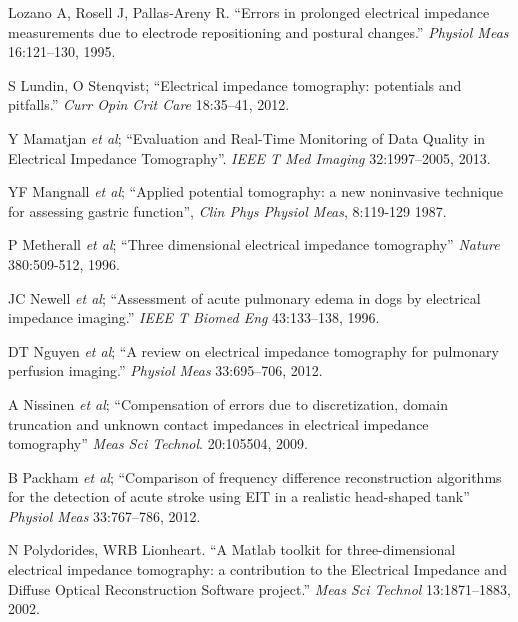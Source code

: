 \documentclass[12pt]{article} \usepackage[margin=3cm]{geometry} \usepackage[margin=20pt,font=small,labelfont=bf]{caption}\def\TBLWIDA{35mm}\def\TBLWIDB{95mm}
\newcommand{\ifmaxthree}[2]{#2 {\em et al}; }
\begin{document}
\begin{thebibliography}{00}
Lozano A, Rosell J, Pallas-Areny R. 
``Errors in prolonged electrical impedance measurements due to electrode repositioning and postural changes.''
{\em  Physiol Meas} 16:121--130, 1995.

S Lundin, O Stenqvist;
``Electrical impedance tomography: potentials and pitfalls.''
{\em Curr Opin Crit Care} 18:35--41, 2012.


\ifmaxthree{
Y Mamatjan, B Grychtol, P Gaggero, J Justiz, V Koch, A Adler. 
}{
Y Mamatjan
}
``Evaluation and Real-Time Monitoring of Data Quality in Electrical Impedance Tomography''.
{\em IEEE T Med Imaging} 32:1997--2005, 2013.

\ifmaxthree{
YF Mangnall, AJ Baxter, R Avill, NC Bird, BH Brown, DC Barber, AD Seagar, AG Johnson, NW Read
}{
YF Mangnall
}
``Applied potential tomography: a new noninvasive technique for assessing gastric function'',
{\em Clin Phys Physiol Meas}, 8:119-129 1987.

\ifmaxthree{
P Metherall, DC Barber, RH Smallwood, BH Brown.
}{
P Metherall
}
``Three dimensional electrical impedance tomography''
{\em Nature} 380:509-512, 1996.

\ifmaxthree{
JC Newell, PM Edic, X Ren, JL Larson-Wiseman, MD Danyleiko,
}{
JC Newell
}
``Assessment of acute pulmonary edema in dogs by electrical impedance imaging.''
{\em  IEEE T Biomed Eng} 43:133--138, 1996.

\ifmaxthree{
DT Nguyen, C Jin, A Thiagalingam, AL McEwan
}{
DT Nguyen
}
``A review on electrical impedance tomography for pulmonary perfusion imaging.''
{\em Physiol Meas} 33:695--706, 2012.

\ifmaxthree{
A Nissinen, LM Heikkinen, V Kolehmainen, JP Kaipio
}{
A Nissinen
}
``Compensation of errors due to discretization, domain truncation and unknown contact impedances in electrical impedance tomography''
{\em  Meas Sci Technol}. 20:105504, 2009.

\ifmaxthree{
B Packham, H Koo, A Romsauerova, S Ahn, A McEwan, SC Jun, DS Holder,
}{
B Packham
}
``Comparison of frequency difference reconstruction algorithms for the detection of acute stroke using EIT in a realistic head-shaped tank''
{\em Physiol Meas} 33:767--786, 2012.



N Polydorides, WRB Lionheart. 
``A Matlab toolkit for three-dimensional electrical impedance tomography: a contribution to the Electrical Impedance and Diffuse Optical Reconstruction Software project.''
{\em Meas Sci Technol} 13:1871--1883, 2002.


\end{thebibliography}
\end{document}
